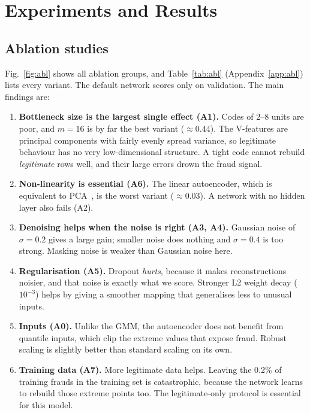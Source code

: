 \documentclass[12pt]{article}
\begin{document}
\section{Experiments and Results}\label{sec:results}

\subsection{Ablation studies}\label{sec:abl}
Fig.~\ref{fig:abl} shows all ablation groups, and Table~\ref{tab:abl} (Appendix~\ref{app:abl}) lists every variant.
The default network scores only \ablDefault{} on validation. The main findings are:
\begin{enumerate}
\item \textbf{Bottleneck size is the largest single effect (A1).} Codes of 2--8 units are poor, and $m=16$ is by far
the best variant ($\approx0.44$). The V-features are principal components with fairly evenly spread variance, so
legitimate behaviour has no very low-dimensional structure. A tight code cannot rebuild \emph{legitimate} rows well,
and their large errors drown the fraud signal.
\item \textbf{Non-linearity is essential (A6).} The linear autoencoder, which is equivalent to PCA~\cite{baldi1989}, is
the worst variant ($\approx0.03$). A network with no hidden layer also fails (A2).
\item \textbf{Denoising helps when the noise is right (A3, A4).} Gaussian noise of $\sigma=0.2$ gives a large gain;
smaller noise does nothing and $\sigma=0.4$ is too strong. Masking noise is weaker than Gaussian noise here.
\item \textbf{Regularisation (A5).} Dropout \emph{hurts}, because it makes reconstructions noisier, and that noise is
exactly what we score. Stronger L2 weight decay ($10^{-3}$) helps by giving a smoother mapping that generalises less to
unusual inputs.
\item \textbf{Inputs (A0).} Unlike the GMM, the autoencoder does not benefit from quantile inputs, which clip the extreme
values that expose fraud. Robust scaling is slightly better than standard scaling on its own.
\item \textbf{Training data (A7).} More legitimate data helps. Leaving the 0.2\% of training frauds in the training set
is catastrophic, because the network learns to rebuild those extreme points too. The legitimate-only protocol is
essential for this model.
\end{enumerate}
\end{document}
